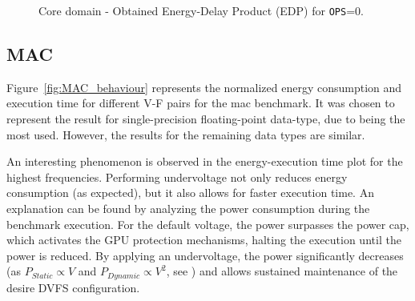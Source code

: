 \begin{figure}[!htb]
  \begin{subfigmatrix}{2}
  \end{subfigmatrix}
  \caption{Core domain - Obtained Energy-Delay Product (EDP) for \texttt{OPS}=0.}
  \label{fig:cache_sm_edp}
\end{figure}



\subsection{MAC}

\label{sec:MAC_behaviour}
Figure~\ref{fig:MAC_behaviour} represents the normalized energy consumption and execution time for different V-F pairs for the \acrshort{mac} benchmark. It was chosen to represent the result for single-precision floating-point data-type, due to being the most used. However, the results for the remaining data types are similar.

An interesting phenomenon is observed in the energy-execution time plot for the highest frequencies. Performing undervoltage not only reduces energy consumption (as expected), but it also allows for faster execution time. An explanation can be found by analyzing the power consumption during the benchmark execution. For the default voltage, the power surpasses the power cap, which activates the GPU protection mechanisms, halting the execution until the power is reduced. By applying an undervoltage, the power significantly decreases (as $P_{Static}\propto V$ and $P_{Dynamic}\propto V^2$, see \cite{guerreiro_gpgpu_2018}) and allows sustained maintenance of the desire DVFS configuration. 

